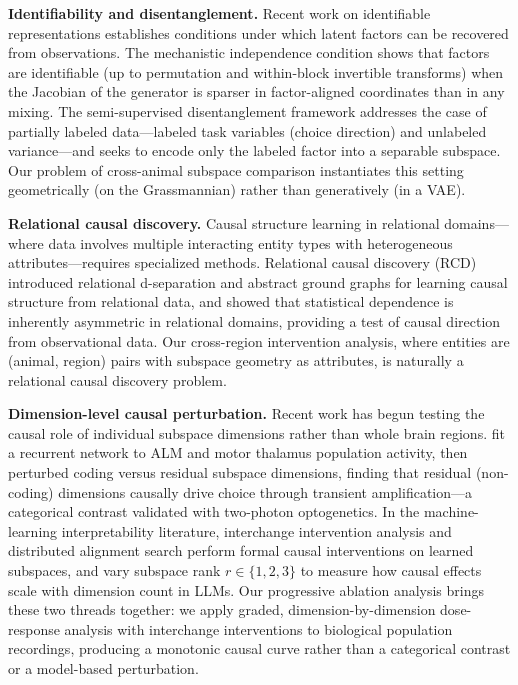 \documentclass{article}
\begin{document}
\textbf{Identifiability and disentanglement.} Recent work on identifiable representations establishes conditions under which latent factors can be recovered from observations. The mechanistic independence condition \citep{sid2026mechanistic} shows that factors are identifiable (up to permutation and within-block invertible transforms) when the Jacobian of the generator is sparser in factor-aligned coordinates than in any mixing. The semi-supervised disentanglement framework \citep{narayanaswamy2017learning} addresses the case of partially labeled data---labeled task variables (choice direction) and unlabeled variance---and seeks to encode only the labeled factor into a separable subspace. Our problem of cross-animal subspace comparison instantiates this setting geometrically (on the Grassmannian) rather than generatively (in a VAE).

\textbf{Relational causal discovery.} Causal structure learning in relational domains---where data involves multiple interacting entity types with heterogeneous attributes---requires specialized methods. Relational causal discovery (RCD) \citep{maier2013sound} introduced relational d-separation and abstract ground graphs for learning causal structure from relational data, and showed that statistical dependence is inherently asymmetric in relational domains, providing a test of causal direction from observational data. Our cross-region intervention analysis, where entities are (animal, region) pairs with subspace geometry as attributes, is naturally a relational causal discovery problem.

\textbf{Dimension-level causal perturbation.} Recent work has begun testing the causal role of individual subspace dimensions rather than whole brain regions. \citet{pereira2025residual} fit a recurrent network to ALM and motor thalamus population activity, then perturbed coding versus residual subspace dimensions, finding that residual (non-coding) dimensions causally drive choice through transient amplification---a categorical contrast validated with two-photon optogenetics. In the machine-learning interpretability literature, interchange intervention analysis \citep[IIA;][]{geiger2024finding} and distributed alignment search \citep[DAS;][]{geiger2024causal} perform formal causal interventions on learned subspaces, and \citet{lowrank2026llm} vary subspace rank $r \in \{1,2,3\}$ to measure how causal effects scale with dimension count in LLMs. Our progressive ablation analysis brings these two threads together: we apply graded, dimension-by-dimension dose-response analysis with interchange interventions to biological population recordings, producing a monotonic causal curve rather than a categorical contrast or a model-based perturbation.
\end{document}
